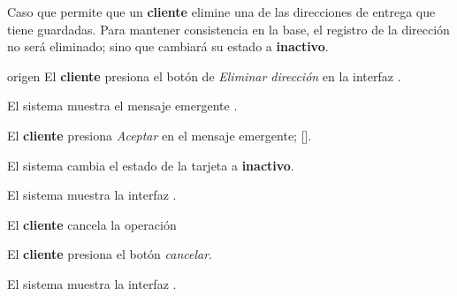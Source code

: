 %
%

{
  Caso que permite que un \textbf{cliente} elimine una de las direcciones de
  entrega que tiene guardadas. Para mantener consistencia en la base, el
  registro de la dirección no será eliminado; sino que cambiará su estado a
  \textbf{inactivo}.

  \begin{trayectoriaPrincipal}

    \item[origen] El \textbf{cliente} presiona el botón de
      \textit{Eliminar dirección} en la interfaz
      .

    \item El sistema muestra el mensaje emergente
      .

    \item El \textbf{cliente} presiona \textit{Aceptar} en el mensaje
      emergente; [].

    \item El sistema cambia el estado de la tarjeta a \textbf{inactivo}.

    \item El sistema muestra la interfaz
      .

  \end{trayectoriaPrincipal}


  \begin{trayectoriaAlternativa}
    {El \textbf{cliente} cancela la operación}

    \item El \textbf{cliente} presiona el botón \textit{cancelar}.

    \item El sistema muestra la interfaz
      .

  \end{trayectoriaAlternativa}
}
